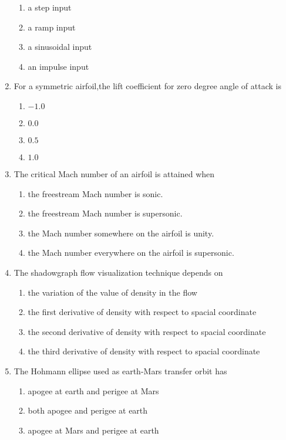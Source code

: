 \documentclass[journal]{IEEEtran}
\begin{document}
\begin{enumerate}
    \begin{enumerate}
        \item a step input
        \item a ramp input
        \item a sinusoidal input
        \item an impulse input
    \end{enumerate}
    \item For a symmetric airfoil,the lift coefficient for zero degree angle of attack is
    \begin{enumerate}
        \item $-1.0$
        \item $0.0$
        \item $0.5$
        \item $1.0$
    \end{enumerate}
    \item The critical Mach number of an airfoil is attained when
    \begin{enumerate}
        \item the freestream Mach number is sonic.
        \item the freestream Mach number is supersonic.
        \item the Mach number somewhere on the airfoil is unity.
        \item the Mach number everywhere on the airfoil is supersonic.
    \end{enumerate}
    \item The shadowgraph flow visualization technique depends on
        \begin{enumerate}
            \item the variation of the value of density in the flow
            \item the first derivative of density with respect to spacial coordinate
            \item the second derivative of density with respect to spacial coordinate
            \item the third derivative of density with respect to spacial coordinate
        \end{enumerate}
    \item The Hohmann ellipse used as earth-Mars transfer orbit has
    \begin{enumerate}
        \item apogee at earth and perigee at Mars
        \item both apogee and perigee at earth
        \item apogee at Mars and perigee at earth

\end{enumerate}
\end{enumerate}
\end{document}

